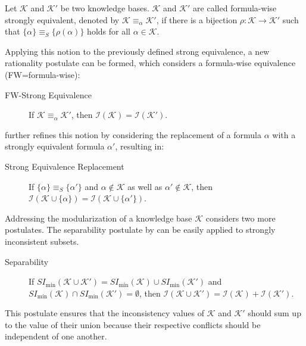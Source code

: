 \begin{definition}\label{def:fwequivalent}
    Let \(\mathcal{K}\) and \(\mathcal{K}'\) be two knowledge bases. \(\mathcal{K}\) and \(\mathcal{K}'\) are called formula-wise strongly equivalent, denoted by \(\mathcal{K} \equiv_{\alpha} \mathcal{K}'\), if there is a bijection \(\rho : \mathcal{K} \rightarrow \mathcal{K}'\) such that \(\{\alpha\} \equiv_S \{\rho(\alpha)\}\) holds for all \(\alpha \in \mathcal{K}\).
\end{definition}

Applying this notion to the previously defined strong equivalence, a new rationality postulate can be formed, which considers a formula-wise equivalence (FW=formula-wise):

\begin{description}
    \item[FW-Strong Equivalence] If \(\mathcal{K} \equiv_{\alpha} \mathcal{K}'\), then \(\mathcal{I}(\mathcal{K}) = \mathcal{I}(\mathcal{K}')\).
\end{description}

\cite{ulbricht_handling_2020} further refines this notion by considering the replacement of a formula \(\alpha\) with a strongly equivalent formula \(\alpha'\), resulting in:

\begin{description}
    \item[Strong Equivalence Replacement] If \(\{\alpha\} \equiv_S \{\alpha'\}\) and \(\alpha \notin \mathcal{K}\) as well as \(\alpha' \notin \mathcal{K}\), then \(\mathcal{I}(\mathcal{K} \cup \{\alpha\}) = \mathcal{I}(\mathcal{K} \cup \{\alpha'\})\).
\end{description}

Addressing the modularization of a knowledge base \(\mathcal{K}\) \cite{ulbricht_measuring_2018} considers two more postulates. The separability postulate by \cite{hunter_measure_2010} can be easily applied to strongly inconsistent subsets.

\begin{description}
    \item[Separability] If \(SI_{\min}(\mathcal{K} \cup \mathcal{K}') = SI_{\min}(\mathcal{K}) \cup SI_{\min}(\mathcal{K}')\) and \(SI_{\min}(\mathcal{K}) \cap SI_{\min}(\mathcal{K}') = \emptyset\), then \(\mathcal{I}(\mathcal{K} \cup \mathcal{K}') = \mathcal{I}(\mathcal{K}) + \mathcal{I}(\mathcal{K}')\).
\end{description}

This postulate ensures that the inconsistency values of \(\mathcal{K}\) and \(\mathcal{K}'\) should sum up to the value of their union because their respective conflicts should be independent of one another.


